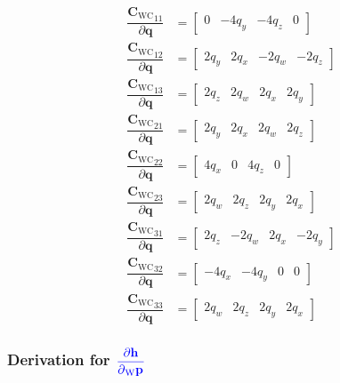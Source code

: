 \documentclass{article}
\renewcommand{\Vec}[1]{{\mathbf{#1}}}
\newcommand{\Mat}[1]{{\mathbf{#1}}}
\newcommand{\quat}{{\Vec{q}}}
\newcommand{\cam}{{\text{C}}}
\newcommand{\world}{{\text{W}}}
\newcommand{\KineNotationTransform}[3]{{{#1}_{#2#3}}}
\newcommand{\KineNotationPart}[3]{{{{}_{#2}} {#1}_{#3}}}
\newcommand{\rot}{{\Mat{C}}}
\newcommand{\Rot}[2]{{\KineNotationTransform{\rot}{#1}{#2}}}
\newcommand{\point}{\Vec{p}}
\newcommand{\Pt}[1]{{\KineNotationPart{\point}{#1}{}}}
\newcommand{\camRot}{{\Rot{\world}{\cam}}}
\newcommand{\projFunc}{{\Vec{h}}}
\begin{document}
\begin{align}
  \dfrac{\camRot_{11}}{\partial{\quat}} &=
    \begin{bmatrix}
    0 & -4q_{y} & -4q_{z} & 0
    \end{bmatrix} \\
  \dfrac{\camRot_{12}}{\partial{\quat}} &=
    \begin{bmatrix}
      2q_{y} & 2q_{x} & -2q_{w} & -2q_{z}
    \end{bmatrix} \\
  \dfrac{\camRot_{13}}{\partial{\quat}} &=
    \begin{bmatrix}
      2q_{z} & 2q_{w} & 2q_{x} & 2q_{y}
    \end{bmatrix} \\
  \dfrac{\camRot_{21}}{\partial{\quat}} &=
  \begin{bmatrix}
    2q_{y} & 2q_{x} & 2q_{w} & 2q_{z}
  \end{bmatrix} \\
  \dfrac{\camRot_{22}}{\partial{\quat}} &=
    \begin{bmatrix}
      4q_{x} & 0 & 4q_{z} & 0
    \end{bmatrix} \\
  \dfrac{\camRot_{23}}{\partial{\quat}} &=
    \begin{bmatrix}
      2q_{w} & 2q_{z} & 2q_{y} & 2q_{x}
    \end{bmatrix} \\
  \dfrac{\camRot_{31}}{\partial{\quat}} &=
    \begin{bmatrix}
      2q_{z} & -2q_{w} & 2q_{x} & -2q_{y}
    \end{bmatrix} \\
  \dfrac{\camRot_{32}}{\partial{\quat}} &=
    \begin{bmatrix}
      -4q_{x} & -4q_{y} & 0 & 0
    \end{bmatrix} \\
  \dfrac{\camRot_{33}}{\partial{\quat}} &=
    \begin{bmatrix}
      2q_{w} & 2q_{z} & 2q_{y} & 2q_{x}
    \end{bmatrix}
\end{align}


\subsubsection*{Derivation for
$\color{blue} \dfrac{\partial{\projFunc}}{\partial{\Pt{\world}}}$}
\end{document}
